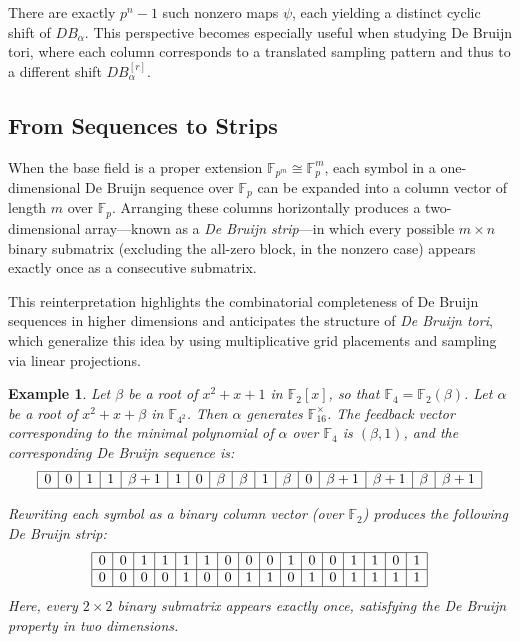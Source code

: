 \documentclass{article}
\newtheorem{example}{Example}[section]
\begin{document}
There are exactly \( p^n - 1 \) such nonzero maps \( \psi \), each yielding a distinct cyclic shift of \( DB_\alpha \). This perspective becomes especially useful when studying De Bruijn tori, where each column corresponds to a translated sampling pattern and thus to a different shift \( DB_\alpha^{[r]} \).



\subsection{From Sequences to Strips}

When the base field is a proper extension \( \mathbb{F}_{p^m} \cong \mathbb{F}_p^m \), each symbol in a one-dimensional De Bruijn sequence over \( \mathbb{F}_p \) can be expanded into a column vector of length \( m \) over \( \mathbb{F}_p \). Arranging these columns horizontally produces a two-dimensional array—known as a \emph{De Bruijn strip}—in which every possible \( m \times n \) binary submatrix (excluding the all-zero block, in the nonzero case) appears exactly once as a consecutive submatrix.

This reinterpretation highlights the combinatorial completeness of De Bruijn sequences in higher dimensions and anticipates the structure of \emph{De Bruijn tori}, which generalize this idea by using multiplicative grid placements and sampling via linear projections.

\begin{example}
Let \(\beta\) be a root of \(x^2 + x + 1\) in \(\mathbb{F}_2[x]\), so that \(\mathbb{F}_4 = \mathbb{F}_2(\beta)\). Let \(\alpha\) be a root of \(x^2 + x + \beta\) in \(\mathbb{F}_{4^2}\). Then \(\alpha\) generates \( \mathbb{F}_{16}^\times \). The feedback vector corresponding to the minimal polynomial of \( \alpha \) over \( \mathbb{F}_4 \) is \( (\beta, 1) \), and the corresponding De Bruijn sequence is:
\[
\begin{array}{|c|c|c|c|c|c|c|c|c|c|c|c|c|c|c|c|}
\hline
0 & 0 & 1 & 1 & \beta+1 & 1 & 0 & \beta & \beta & 1 & \beta & 0 & \beta+1 & \beta+1 & \beta & \beta+1 \\ 
\hline
\end{array}
\]

Rewriting each symbol as a binary column vector (over \( \mathbb{F}_2 \)) produces the following \emph{De Bruijn strip}:
\[
\begin{array}{|c|c|c|c|c|c|c|c|c|c|c|c|c|c|c|c|}
\hline
0 & 0 & 1 & 1 & 1 & 1 & 0 & 0 & 0 & 1 & 0 & 0 & 1 & 1 & 0 & 1 \\
\hline
0 & 0 & 0 & 0 & 1 & 0 & 0 & 1 & 1 & 0 & 1 & 0 & 1 & 1 & 1 & 1 \\
\hline
\end{array}
\]
Here, every \( 2 \times 2 \) binary submatrix appears exactly once, satisfying the De Bruijn property in two dimensions.
\end{example}
\end{document}
